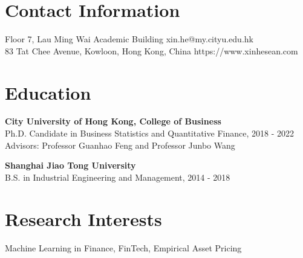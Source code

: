 \documentclass[margin]{res}
\begin{document}
\begin{resume}




\section{\sc Contact Information}
	Floor 7, Lau Ming Wai Academic Building	   \hfill xin.he@my.cityu.edu.hk\\        
	83 Tat Chee Avenue, Kowloon, Hong Kong, China 	\hfill   https://www.xinhesean.com \\

\vspace{5mm}

\section{\sc Education}
\textbf{City University of Hong Kong, College of Business}\\
{Ph.D. Candidate in Business Statistics and Quantitative Finance, 2018 - 2022}\\
Advisors: Professor Guanhao Feng and Professor Junbo Wang

\textbf{Shanghai Jiao Tong University}\\
{B.S. in Industrial Engineering and Management, 2014 - 2018}

\vspace{5mm}

\section{\sc Research Interests}
{Machine Learning in Finance, FinTech, Empirical Asset Pricing}


\end{resume}
\end{document}
